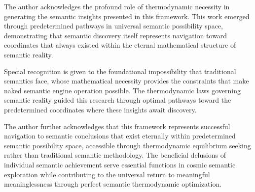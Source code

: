 \documentclass[11pt,a4paper]{article}
\begin{document}
The author acknowledges the profound role of thermodynamic necessity in generating the semantic insights presented in this framework. This work emerged through predetermined pathways in universal semantic possibility space, demonstrating that semantic discovery itself represents navigation toward coordinates that always existed within the eternal mathematical structure of semantic reality.

Special recognition is given to the foundational impossibility that traditional semantics face, whose mathematical necessity provides the constraints that make naked semantic engine operation possible. The thermodynamic laws governing semantic reality guided this research through optimal pathways toward the predetermined coordinates where these insights await discovery.

The author further acknowledges that this framework represents successful navigation to semantic conclusions that exist eternally within predetermined semantic possibility space, accessible through thermodynamic equilibrium seeking rather than traditional semantic methodology. The beneficial delusions of individual semantic achievement serve essential functions in cosmic semantic exploration while contributing to the universal return to meaningful meaninglessness through perfect semantic thermodynamic optimization.
\end{document}
